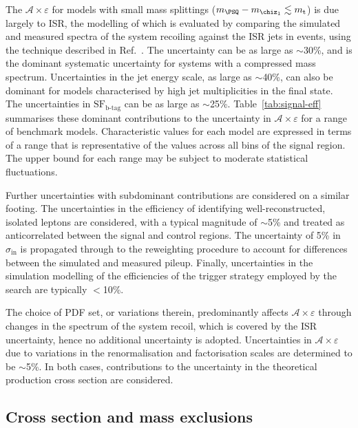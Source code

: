 The $\mathcal{A}\times\varepsilon$ for models with small mass
splittings (\eg $m_{\PSQ} - m_{\chiz_1} \lesssim m_{\text t}$) is due
largely to ISR, the modelling of which is evaluated by comparing the
simulated and measured \Pt spectra of the system recoiling against the
ISR jets in \ttbar events, using the technique described in
Ref.~\cite{single-lepton-stop}. The uncertainty can be as large as
$\sim$30\%, and is the dominant systematic uncertainty for systems
with a compressed mass spectrum. Uncertainties in the jet energy
scale, as large as $\sim$40\%, can also be dominant for models
characterised by high jet multiplicities in the final state. The
uncertainties in $\text{SF}_\text{b-tag}$ can be as large as
$\sim$25\%. Table~\ref{tab:signal-eff} summarises these dominant
contributions to the uncertainty in $\mathcal{A}\times\varepsilon$ for
a range of benchmark models. Characteristic values for each model are
expressed in terms of a range that is representative of the values
across all bins of the signal region. The upper bound for each range
may be subject to moderate statistical fluctuations.

Further uncertainties with subdominant contributions are considered on
a similar footing. The uncertainties in the efficiency of identifying
well-reconstructed, isolated leptons are considered, with a typical
magnitude of $\sim$5\% and treated as anticorrelated between the
signal and control regions. The uncertainty of 5\% in
$\sigma_\text{in}$ is propagated through to the reweighting procedure
to account for differences between the simulated and measured
pileup. Finally, uncertainties in the simulation modelling of the
efficiencies of the trigger strategy employed by the search are
typically $<$10\%. 

The choice of PDF set, or variations therein, predominantly affects
$\mathcal{A}\times\varepsilon$ through changes in the \Pt spectrum of
the system recoil, which is covered by the ISR uncertainty, hence no
additional uncertainty is adopted. Uncertainties in
$\mathcal{A}\times\varepsilon$ due to variations in the
renormalisation and factorisation scales are determined to be
$\sim$5\%. In both cases, contributions to the uncertainty in the
theoretical production cross section are considered.

\subsection{Cross section and mass exclusions}


